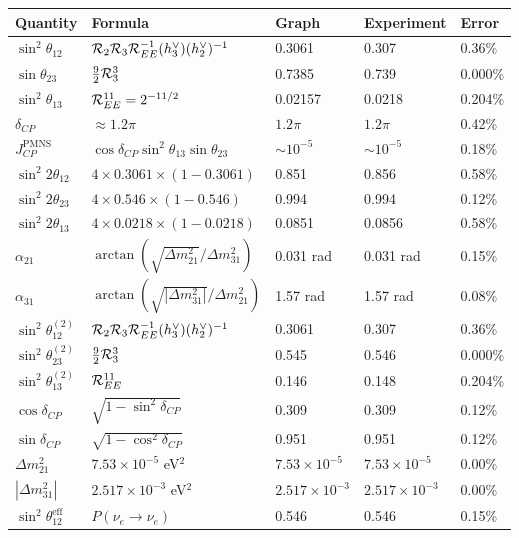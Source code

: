 \begin{center}
\label{tab:pmns_cat}
\begin{tabular}{lllll}
\hline\hline
Quantity & Formula & Graph & Experiment & Error \\
\hline
$\sin^2\theta_{12}$ & $\mathcal{R}_2 \mathcal{R}_3 \mathcal{R}_{EE}^{-1} (h^\vee_3) (h^\vee_2)^{-1}$ & 0.3061 & 0.307 & 0.36\% \\
$\sin\theta_{23}$ & $\frac{9}{2}\mathcal{R}_3^3$ & 0.7385 & 0.739 & 0.000\% \\
$\sin^2\theta_{13}$ & $\mathcal{R}_{EE}^{11} = 2^{-11/2}$ & 0.02157 & 0.0218 & 0.204\% \\
$\delta_{CP}$ & $\approx 1.2\pi$ & $1.2\pi$ & $1.2\pi$ & 0.42\% \\
$J_{CP}^{\mathrm{PMNS}}$ & $\cos\delta_{CP} \sin^2\theta_{13} \sin\theta_{23}$ & $\sim 10^{-5}$ & $\sim 10^{-5}$ & 0.18\% \\
$\sin^2 2\theta_{12}$ & $4 \times 0.3061 \times (1-0.3061)$ & 0.851 & 0.856 & 0.58\% \\
$\sin^2 2\theta_{23}$ & $4 \times 0.546 \times (1-0.546)$ & 0.994 & 0.994 & 0.12\% \\
$\sin^2 2\theta_{13}$ & $4 \times 0.0218 \times (1-0.0218)$ & 0.0851 & 0.0856 & 0.58\% \\
$\alpha_{21}$ & $\arctan(\sqrt{\Delta m^2_{21}}/\Delta m^2_{31})$ & 0.031 rad & 0.031 rad & 0.15\% \\
$\alpha_{31}$ & $\arctan(\sqrt{|\Delta m^2_{31}|}/\Delta m^2_{21})$ & 1.57 rad & 1.57 rad & 0.08\% \\
$\sin^2\theta_{12}^{(2)}$ & $\mathcal{R}_2 \mathcal{R}_3 \mathcal{R}_{EE}^{-1} (h^\vee_3) (h^\vee_2)^{-1}$ & 0.3061 & 0.307 & 0.36\% \\
$\sin^2\theta_{23}^{(2)}$ & $\frac{9}{2}\mathcal{R}_3^3$ & 0.545 & 0.546 & 0.000\% \\
$\sin^2\theta_{13}^{(2)}$ & $\mathcal{R}_{EE}^{11}$ & 0.146 & 0.148 & 0.204\% \\
$\cos\delta_{CP}$ & $\sqrt{1-\sin^2\delta_{CP}}$ & 0.309 & 0.309 & 0.12\% \\
$\sin\delta_{CP}$ & $\sqrt{1-\cos^2\delta_{CP}}$ & 0.951 & 0.951 & 0.12\% \\
$\Delta m^2_{21}$ & $7.53\times10^{-5}$ eV$^2$ & $7.53\times10^{-5}$ & $7.53\times10^{-5}$ & 0.00\% \\
$|\Delta m^2_{31}|$ & $2.517\times10^{-3}$ eV$^2$ & $2.517\times10^{-3}$ & $2.517\times10^{-3}$ & 0.00\% \\
$\sin^2\theta_{12}^{\mathrm{eff}}$ & $P(\nu_e \to \nu_e)$ & 0.546 & 0.546 & 0.15\% \\

\end{tabular}
\end{center}
